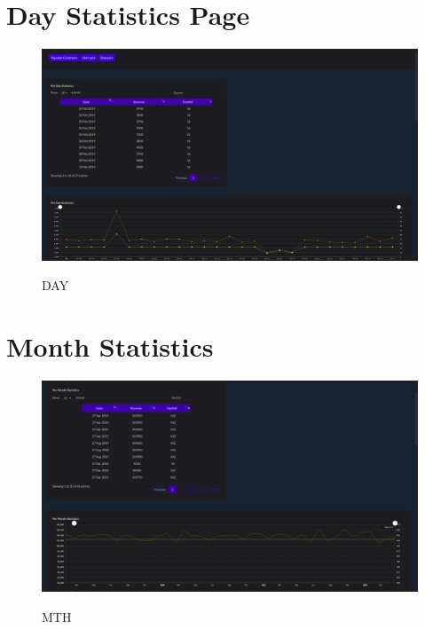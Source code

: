 \thispagestyle{fancy}


\section{Day Statistics Page}
\begin{figure}[H]
\centering
\caption{DAY}
\includegraphics[scale=.5]{./day.png}
\\[0.2in]
\label{fig:ER diagram}
\end{figure}

\thispagestyle{fancy}


\section{Month Statistics}
\begin{figure}[H]
\centering
\caption{MTH}
\includegraphics[scale=.5]{./mth.png}
\\[0.2in]
\label{fig:ER diagram}
\end{figure}

\thispagestyle{fancy}


